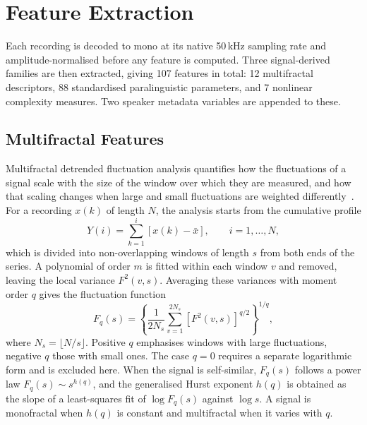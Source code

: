 \documentclass[runningheads]{llncs}
\begin{document}
  \section{Feature Extraction}
  \label{sec:features}

  Each recording is decoded to mono at its native 50\,kHz sampling rate and amplitude-normalised before any feature is computed. Three signal-derived families are then extracted, giving 107 features in total: 12 multifractal descriptors, 88 standardised paralinguistic parameters, and 7 nonlinear complexity measures. Two speaker metadata variables are appended to these.

  \subsection{Multifractal Features}

  Multifractal detrended fluctuation analysis quantifies how the fluctuations of a signal scale with the size of the window over which they are measured, and how that scaling changes when large and small fluctuations are weighted differently~\cite{mfdfa}. For a recording $x(k)$ of length $N$, the analysis starts from the cumulative profile
  \begin{equation}
  Y(i) = \sum_{k=1}^{i} \left[ x(k) - \bar{x} \right], \qquad i = 1,\dots,N ,
  \end{equation}
  which is divided into non-overlapping windows of length $s$ from both ends of the series. A polynomial of order $m$ is fitted within each window $v$ and removed, leaving the local variance $F^2(v,s)$. Averaging these variances with moment order $q$ gives the fluctuation function
  \begin{equation}
  F_q(s) = \left\{ \frac{1}{2N_s} \sum_{v=1}^{2N_s} \left[ F^2(v,s) \right]^{q/2} \right\}^{1/q},
  \label{eq:fq}
  \end{equation}
  where $N_s = \lfloor N/s \rfloor$. Positive $q$ emphasises windows with large fluctuations, negative $q$ those with small ones. The case $q = 0$ requires a separate logarithmic form and is excluded here. When the signal is self-similar, $F_q(s)$ follows a power law $F_q(s) \sim s^{h(q)}$, and the generalised Hurst exponent $h(q)$ is obtained as the slope of a least-squares fit of $\log F_q(s)$ against $\log s$. A signal is monofractal when $h(q)$ is constant and multifractal when it varies with $q$.
\end{document}
